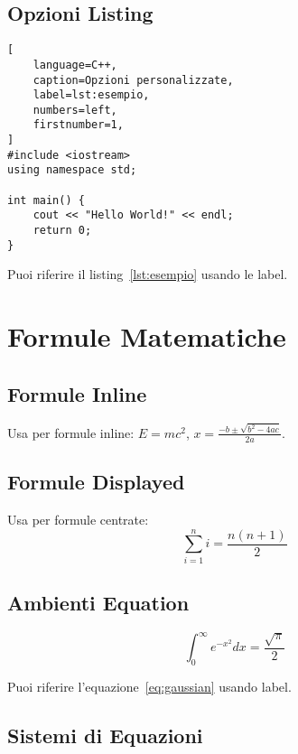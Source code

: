 \documentclass{csnotes}
\begin{document}
\subsection{Opzioni Listing}

\begin{lstlisting}[
    language=C++,
    caption=Opzioni personalizzate,
    label=lst:esempio,
    numbers=left,
    firstnumber=1,
]
#include <iostream>
using namespace std;

int main() {
    cout << "Hello World!" << endl;
    return 0;
}
\end{lstlisting}

Puoi riferire il listing~\ref{lst:esempio} usando le label.

\newpage
\section{Formule Matematiche}

\subsection{Formule Inline}

Usa  per formule inline: 
\(E = mc^2\), \(x = \frac{-b \pm \sqrt{b^2 - 4ac}}{2a}\).

\subsection{Formule Displayed}

Usa \code{\textbackslash[...\textbackslash]} per formule centrate:
\[
\sum_{i=1}^{n} i = \frac{n(n+1)}{2}
\]

\subsection{Ambienti Equation}

\begin{equation}
    \int_0^\infty e^{-x^2} dx = \frac{\sqrt{\pi}}{2}
    \label{eq:gaussian}
\end{equation}

Puoi riferire l'equazione~\eqref{eq:gaussian} usando label.

\subsection{Sistemi di Equazioni}
\end{document}
